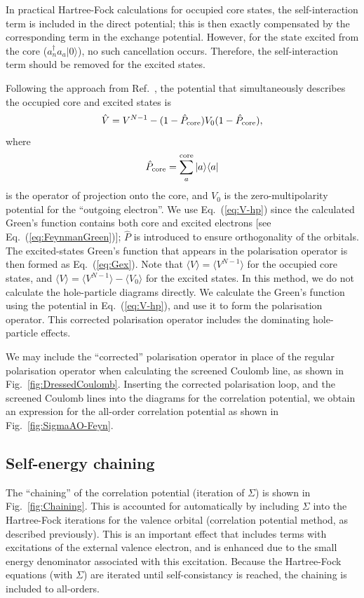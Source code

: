\documentclass[10pt,twocolumn,a4paper]{article}%
\newcommand{\bra}[1]{\ensuremath{\langle #1|}}	%
\newcommand{\ket}[1]{\ensuremath{|#1\rangle}}	%
\newcommand{\braket}[1]{\ensuremath{\langle #1\rangle}}	%
\newcommand{\be}{\begin{equation}}
\newcommand{\ee}{\end{equation}}
\begin{document}
In practical Hartree-Fock calculations for occupied core states, the self-interaction term is included in the direct potential; this is then exactly compensated by the corresponding term in the exchange potential. %
However, for the state excited from the core ($a_n^\dag a_a\ket{0}$), no such cancellation occurs.
Therefore, the self-interaction term should be removed for the excited states.




Following the approach from Ref.~\cite{DzubaCPM1989plaEn}, the potential that simultaneously describes the occupied core and excited states is
\be\label{eq:V-hp}
\hat V = V^{N-1} - (1-\hat P_{\rm core})V_0 (1-\hat P_{\rm core}),
\ee
where
\be
\hat P_{\rm core} = \sum_a^{\rm core}\ket{a}\bra{a}
\ee
is the operator of projection onto the core, and
 $V_0$ is the zero-multipolarity potential for the ``outgoing electron''.
%
We use Eq.~(\ref{eq:V-hp}) since the calculated Green's function contains both core and excited electrons [see Eq.~(\ref{eq:FeynmanGreen})]; $\hat P$ is introduced to ensure orthogonality of the orbitals.
The excited-states Green's function that appears in the polarisation operator is then formed as Eq.~(\ref{eq:Gex}).
Note that $\braket{V}=\braket{V^{N-1}}$ for the occupied core states, and
$\braket{V}=\braket{V^{N-1}}-\braket{V_0}$ for the excited states.
In this method, we do not calculate the hole-particle diagrams directly.
We calculate the Green's function using the potential in Eq.~(\ref{eq:V-hp}), and use it to form the polarisation operator.
This corrected polarisation operator includes the dominating hole-particle effects.


We may include the ``corrected'' polarisation operator in place of the regular polarisation operator when calculating the screened Coulomb line, as shown in Fig.~\ref{fig:DressedCoulomb}.
Inserting the corrected polarisation loop, and the screened Coulomb lines into the diagrams for the correlation potential, we obtain an expression for the all-order correlation potential as shown in Fig.~\ref{fig:SigmaAO-Feyn}.







\subsection{Self-energy chaining}

The ``chaining'' of the correlation potential (iteration of $\Sigma$) is shown in Fig.~\ref{fig:Chaining}.
This is accounted for automatically by including $\Sigma$ into the Hartree-Fock iterations for the valence orbital (correlation potential method, as described previously).
This is an important effect that includes terms with excitations of the external valence electron, and is enhanced due to the small energy denominator associated with this excitation.
Because the Hartree-Fock equations (with $\Sigma$) are iterated until self-consistancy is reached, the chaining is included to all-orders.
\end{document}
